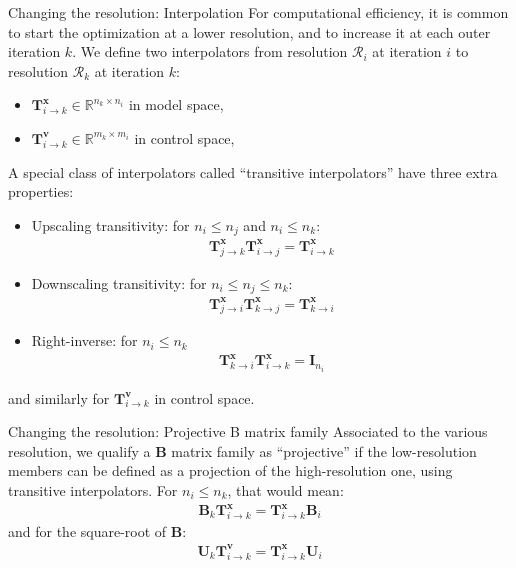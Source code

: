 \documentclass[8pt]{beamer}
\begin{document}
\begin{frame}{Changing the resolution: Interpolation}
For computational efficiency, it is common to start the optimization at a lower resolution, and to increase it at each outer iteration $k$. We define two interpolators from resolution $\mathcal{R}_i$ at iteration $i$ to resolution $\mathcal{R}_k$ at iteration $k$:
\begin{itemize}
\item $\mathbf{T}^\mathbf{x}_{i \rightarrow k} \in \mathbb{R}^{n_k \times n_i}$ in model space,
\item $\mathbf{T}^\mathbf{v}_{i \rightarrow k} \in \mathbb{R}^{m_k \times m_i}$ in control space,
\end{itemize}
$  $\\
A special class of interpolators called ``transitive interpolators'' have three extra properties:
\begin{itemize}
\item Upscaling transitivity: for $n_i \le n_j$ and $n_i \le n_k$:
\begin{align}
\mathbf{T}^\mathbf{x}_{j \rightarrow k} \mathbf{T}^\mathbf{x}_{i \rightarrow j} = \mathbf{T}^\mathbf{x}_{i \rightarrow k}
\end{align}
\item Downscaling transitivity: for $n_i \le n_j \le n_k$:
\begin{align}
\mathbf{T}^\mathbf{x}_{j \rightarrow i} \mathbf{T}^\mathbf{x}_{k \rightarrow j} = \mathbf{T}^\mathbf{x}_{k \rightarrow i}
\end{align}
\item Right-inverse: for $n_i \le n_k$
\begin{align}
\mathbf{T}^\mathbf{x}_{k \rightarrow i} \mathbf{T}^\mathbf{x}_{i \rightarrow k} = \mathbf{I}_{n_i}
\end{align}
\end{itemize}
and similarly for $\mathbf{T}^\mathbf{v}_{i \rightarrow k}$ in control space.
\end{frame}

\begin{frame}{Changing the resolution: Projective B matrix family}
Associated to the various resolution, we qualify a $\mathbf{B}$ matrix family as ``projective'' if the low-resolution members can be defined as a projection of the high-resolution one, using transitive interpolators. For $n_i \le n_k$, that would mean:
\begin{align}
\label{eq:projective_definition_B}
\mathbf{B}_k \mathbf{T}^\mathbf{x}_{i \rightarrow k} = \mathbf{T}^\mathbf{x}_{i \rightarrow k} \mathbf{B}_i
\end{align}
and for the square-root of $\mathbf{B}$:
\begin{align}
\label{eq:projective_definition_U}
\mathbf{U}_k \mathbf{T}^\mathbf{v}_{i \rightarrow k} = \mathbf{T}^\mathbf{x}_{i \rightarrow k} \mathbf{U}_i
\end{align}
\end{frame}
\end{document}
